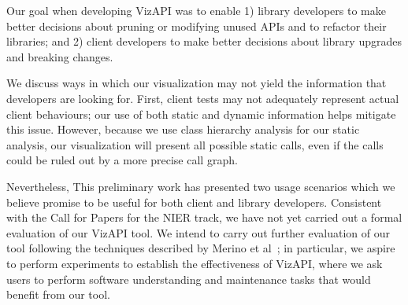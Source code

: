 \label{sec:discussion}
Our goal when developing VizAPI was to enable 1) library developers to make better
decisions about pruning or modifying unused APIs and to refactor their
libraries; and 2) client developers to make better decisions about library
upgrades and breaking changes.


We discuss ways in which our visualization may not yield the
information that developers are looking for. First, client tests may
not adequately represent actual client behaviours; our use of both static
and dynamic information helps mitigate this issue. However, because we use
class hierarchy analysis for our static analysis, our visualization will present
all possible static calls, even if the calls could be ruled out by a more
precise call graph.

Nevertheless, This preliminary work has presented two usage scenarios which we
believe promise to be useful for both client and library
developers. Consistent with the Call for Papers for the NIER track, we
have not yet carried out a formal evaluation of our VizAPI tool. We
intend to carry out further evaluation of our tool following the
techniques described by Merino et
al~\cite{merino18:_system_liter_review_softw_visual_evaluat}; in
particular, we aspire to perform experiments to establish the
effectiveness of VizAPI, where we ask users to perform software
understanding and maintenance tasks that would benefit from our tool.


